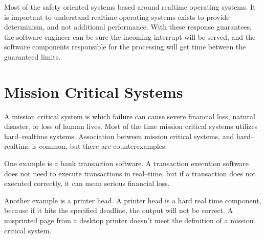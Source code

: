 Most of the safety oriented systems based around realtime operating systems. It is important to understand realtime operating systems exists to provide determinism, and not additional performance. With these response guarantees, the software engineer can be sure the incoming interrupt will be served, and the software components responsible for the processing will get \cpu time between the guaranteed limits.

\section{Mission Critical Systems}

A mission critical system is which failure can cause severe financial loss, natural disaster, or loss of human lives. Most of the time mission critical systems utilizes hard--realtime systems. Association between mission critical systems, and hard--realtime is common, but there are counterexamples:

One example is a bank transaction software. A transaction execution software does not need to execute transactions in real--time, but if a transaction does not executed correctly, it can mean serious financial loss.

Another example is a printer head. A printer head is a hard real time component, because if it hits the specified deadline, the output will not be correct. A misprinted page from a desktop printer doesn't meet the definition of a mission critical system.
